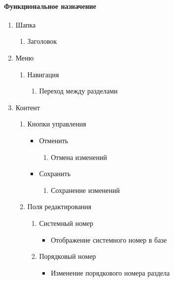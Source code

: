 \paragraph{Функциональное назначение}
\begin{enumerate}
    \item Шапка
    \begin{enumerate}
        \item Заголовок
    \end{enumerate}

    \item Меню
    \begin{enumerate}
        \item Навигация
        \begin{enumerate}
            \item Переход между разделами
        \end{enumerate}
    \end{enumerate}

    \item Контент
    \begin{enumerate}
        \item Кнопки управления
        \begin{itemize}
            \item Отменить
            \begin{enumerate}
                \item Отмена изменений
            \end{enumerate}

            \item Сохранить
            \begin{enumerate}
                \item Сохранение изменений
            \end{enumerate}
        \end{itemize}

        \item Поля редактирования
        \begin{enumerate}
            \item Системный номер
            \begin{itemize}
                \item Отображение системного номер в базе
            \end{itemize}

            \item Порядковый номер
            \begin{itemize}
                \item Изменение порядкового номера раздела
            \end{itemize}


\end{enumerate}
\end{enumerate}
\end{enumerate}
